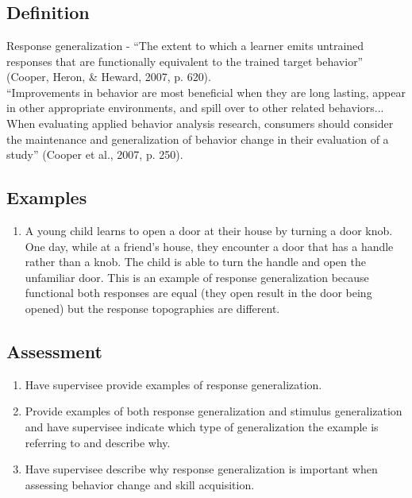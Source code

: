\section{\fourFKThirtySix{}}
\subsection{Definition} 
Response generalization - ``The extent to which a learner emits untrained responses that are functionally equivalent to the trained target behavior'' (Cooper, Heron, \& Heward, 2007, p. 620).\\
%
``Improvements in behavior are most beneficial when they are long lasting, appear in other appropriate environments, and spill over to other related behaviors... When evaluating applied behavior analysis research, consumers should consider the maintenance and generalization of behavior change in their evaluation of a study'' (Cooper et al., 2007, p. 250).\\
%
\subsection{Examples}
\begin{enumerate}
\item A young child learns to open a door at their house by turning a door knob. One day, while at a friend's house, they encounter a door that has a handle rather than a knob. The child is able to turn the handle and open the unfamiliar door. This is an example of response generalization because functional both responses are equal (they open result in the door being opened) but the response topographies are different.
%
\end{enumerate}
%
\subsection{Assessment}
\begin{enumerate}
\item Have supervisee provide examples of response generalization.
\item Provide examples of both response generalization and stimulus generalization and have supervisee indicate which type of generalization the example is referring to and describe why.
\item Have supervisee describe why response generalization is important when assessing behavior change and skill acquisition.
%
\end{enumerate}
%
